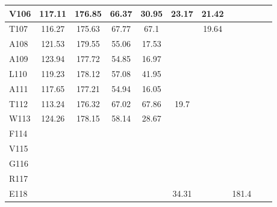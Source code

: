 \documentclass[%
 aip,
 amsmath,amssymb,
 preprint,%
]{revtex4-1}
\begin{document}
\begin{center}
\begin{longtable}{l|c|c|c|c|c|c|c|c|c}
V106 & 117.11 & 176.85 & 66.37 & 30.95 & 23.17 & 21.42 & & & \\\hline
T107 & 116.27 & 175.63 & 67.77 & 67.1 & & 19.64 & & & \\\hline
A108 & 121.53 & 179.55 & 55.06 & 17.53 & & & & & \\\hline
A109 & 123.94 & 177.72 & 54.85 & 16.97 & & & & & \\\hline
L110 & 119.23 & 178.12 & 57.08 & 41.95 & & & & & \\\hline
A111 & 117.65 & 177.21 & 54.94 & 16.05 & & & & & \\\hline
T112 & 113.24 & 176.32 & 67.02 & 67.86 & 19.7 & & & & \\\hline
W113 & 124.26 & 178.15 & 58.14 & 28.67 & & & & & \\\hline
F114 & & & & & & & & & \\\hline
V115 & & & & & & & & & \\\hline
G116 & & & & & & & & & \\\hline
R117 & & & & & & & & & \\\hline
E118 & & & & & 34.31 & & 181.4 & & \\\hline
\end{longtable}
\end{center}
\endgroup

\clearpage
\end{document}
